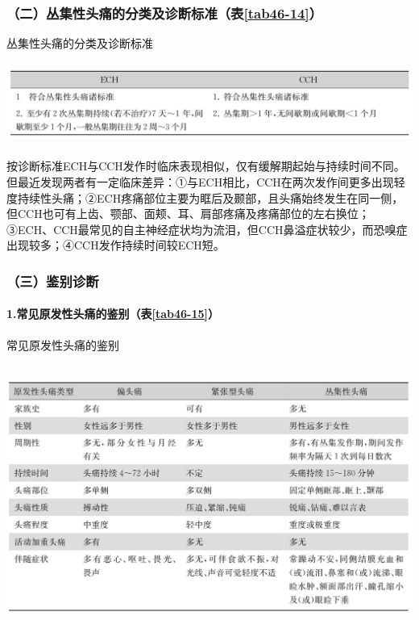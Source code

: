 \subsubsection{（二）丛集性头痛的分类及诊断标准（表\ref{tab46-14}）}

\begin{table}[htbp]
\centering
\caption{丛集性头痛的分类及诊断标准}
\label{tab46-14}
\includegraphics[width=5.9375in,height=1.04167in]{./images/Image00291.jpg}
\end{table}

按诊断标准ECH与CCH发作时临床表现相似，仅有缓解期起始与持续时间不同。但最近发现两者有一定临床差异：①与ECH相比，CCH在两次发作间更多出现轻度持续性头痛；②ECH疼痛部位主要为眶后及颞部，且头痛始终发生在同一侧，但CCH也可有上齿、颚部、面颊、耳、肩部疼痛及疼痛部位的左右换位；③ECH、CCH最常见的自主神经症状均为流泪，但CCH鼻溢症状较少，而恐嗅症出现较多；④CCH发作持续时间较ECH短。

\subsubsection{（三）鉴别诊断}

\paragraph{1.常见原发性头痛的鉴别（表\ref{tab46-15}）}

\begin{table}[htbp]
\centering
\caption{常见原发性头痛的鉴别}
\label{tab46-15}
\includegraphics[width=5.91667in,height=3.40625in]{./images/Image00292.jpg}
\end{table}


